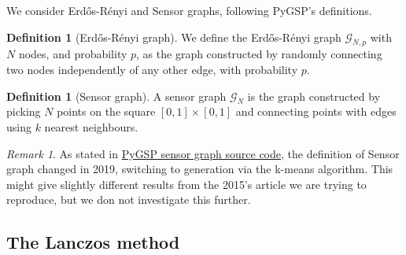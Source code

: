 \documentclass[11pt]{article}
\newcommand{\G}{\mathcal{G}}
\theoremstyle{definition}
\newtheorem{definition}[theorem]{Definition}
\theoremstyle{remark}
\newtheorem{remark}[theorem]{Remark}
\theoremstyle{experimental}
\begin{document}
We consider Erdős-Rényi and Sensor graphs, following PyGSP's \cite{pygsp} definitions.
\begin{definition}[Erdős-Rényi graph]
  \label{def:ER}
  We define the Erdős-Rényi graph $ \G_{N,p} $ with $ N $ nodes, and probability $ p $, as the graph
  constructed by randomly connecting two nodes independently of any other edge, with probability $ p $.
\end{definition}
\begin{definition}[Sensor graph]
  \label{def:Sensor}
  A sensor graph $ \G_N $ is the graph constructed by picking $ N $ points on the square $ \left[
  0,1 \right] \times \left[ 0,1 \right] $ and connecting points with edges using $ k $ nearest
  neighbours.
\end{definition}
\begin{remark}
  As stated in \href{https://github.com/epfl-lts2/pygsp/blob/4716b12c470c579e3f477f2d1c1d99752c73252d/pygsp/graphs/nngraphs/sensor.py#L6}{PyGSP
    sensor graph source code}, the definition of Sensor graph changed in 2019, switching to
    generation via the k-means algorithm. This might give slightly different results from the 2015's article
    \cite{susnjara2015} we are trying to reproduce, but we don not investigate this further.
  
\end{remark}



\subsection{The Lanczos method}
\end{document}
